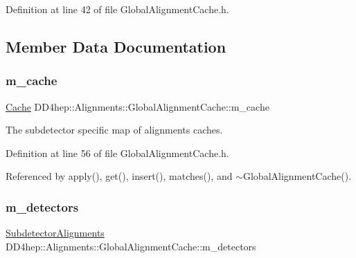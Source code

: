 Definition at line 42 of file Global\+Alignment\+Cache.\+h.



\subsection{Member Data Documentation}
\hypertarget{class_d_d4hep_1_1_alignments_1_1_global_alignment_cache_a00b2ed5078af798d881bf59d8a30bed3}{}\label{class_d_d4hep_1_1_alignments_1_1_global_alignment_cache_a00b2ed5078af798d881bf59d8a30bed3} 
\subsubsection{\texorpdfstring{m\+\_\+cache}{m\_cache}}
{\footnotesize\ttfamily \hyperlink{class_d_d4hep_1_1_alignments_1_1_global_alignment_cache_a51cc6e8b7d9d85cfc296e8db7f360604}{Cache} D\+D4hep\+::\+Alignments\+::\+Global\+Alignment\+Cache\+::m\+\_\+cache\hspace{0.3cm}{\ttfamily [protected]}}



The subdetector specific map of alignments caches. 



Definition at line 56 of file Global\+Alignment\+Cache.\+h.



Referenced by apply(), get(), insert(), matches(), and $\sim$\+Global\+Alignment\+Cache().

\hypertarget{class_d_d4hep_1_1_alignments_1_1_global_alignment_cache_abf497ee00ee5dbe22b05c75041c0e2c8}{}\label{class_d_d4hep_1_1_alignments_1_1_global_alignment_cache_abf497ee00ee5dbe22b05c75041c0e2c8} 
\subsubsection{\texorpdfstring{m\+\_\+detectors}{m\_detectors}}
{\footnotesize\ttfamily \hyperlink{class_d_d4hep_1_1_alignments_1_1_global_alignment_cache_abedb85cf969b8fb161695f5eca9717bc}{Subdetector\+Alignments} D\+D4hep\+::\+Alignments\+::\+Global\+Alignment\+Cache\+::m\+\_\+detectors\hspace{0.3cm}{\ttfamily [protected]}}



